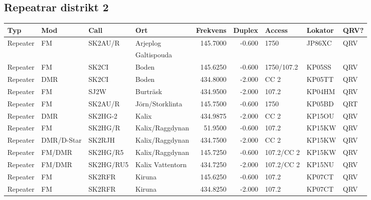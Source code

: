 \normalsize

\subsection{Repeatrar distrikt 2}

\scriptsize

\begin{longtable}{llllrrlll}
\bf Typ  & \bf Mod     & \bf Call & \bf Ort     & \bf Frekvens & \bf Duplex & \bf Access & \bf Lokator & \bf QRV? \\ \hline
Repeater   & FM          & SK2AU/R   & Arjeplog           & 145.7000     & -0.600     & 1750       & JP86XC      & QRV      \\
           &             &           & Galtispouda        &              &            &            &             &          \\
Repeater   & FM          & SK2CI     & Boden              & 145.6250     & -0.600     & 1750/107.2 & KP05SS      & QRV      \\
Repeater   & DMR         & SK2CI     & Boden              & 434.8000     & -2.000     & CC 2       & KP05TT      & QRV      \\
Repeater   & FM          & SJ2W      & Burträsk           & 434.9500     & -2.000     & 107.2      & KP04HM      & QRV      \\
Repeater   & FM          & SK2AU/R   & Jörn/Storklinta    & 145.7500     & -0.600     & 1750       & KP05BD      & QRT      \\
Repeater   & DMR         & SK2HG-2   & Kalix              & 434.9875     & -2.000     & CC 2       & KP15OU      & QRV      \\
Repeater   & FM          & SK2HG/R   & Kalix/Raggdynan    & 51.9500      & -0.600     & 107.2      & KP15KW      & QRV      \\
Repeater   & DMR/D-Star  & SK2RJH    & Kalix/Raggdynan    & 434.7500     & -2.000     & CC 2       & KP15KW      & QRV      \\
Repeater   & FM/DMR      & SK2HG/R5  & Kalix/Raggdynan    & 145.7250     & -0.600     & 107.2/CC 2 & KP15KW      & QRV      \\
Repeater   & FM/DMR      & SK2HG/RU5 & Kalix Vattentorn   & 434.7250     & -2.000     & 107.2/CC 2 & KP15NU      & QRV      \\
Repeater   & FM          & SK2RFR    & Kiruna             & 145.6250     & -0.600     & 107.2      & KP07CT      & QRV      \\
Repeater   & FM          & SK2RFR    & Kiruna             & 434.8250     & -2.000     & 107.2      & KP07CT      & QRV      \\

\end{longtable}
